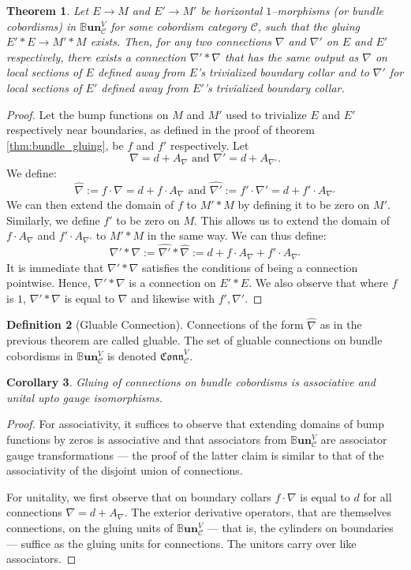 \documentclass{amsart}
\newcommand{\s}{\mathscr}
\newcommand{\wh}{\widehat}
\renewcommand{\to}[1][]{\stackrel{#1}{\longrightarrow}}
\newcommand{\BBun}{\mathbb{B}\textbf{un}}
\newcommand{\Conn}{\mathfrak{Conn}}
\newtheorem{thm}{Theorem}
\numberwithin{thm}{section}
\newtheorem{cor}[thm]{Corollary}
\theoremstyle{definition}
\newtheorem{defn}[thm]{Definition}
\begin{document}
\begin{thm}
Let $E \to M$ and $E' \to M'$ be horizontal $1$--morphisms
(or bundle cobordisms) in $\BBun^V_{\s{C}}$ for some cobordism category $\s{C}$,
such that the gluing $E' * E \to M' * M$ exists. Then, for any two connections
$\nabla$ and $\nabla'$ on $E$ and $E'$ respectively, there exists a connection
$\nabla' * \nabla$ that has the same output as $\nabla$ on local sections of $E$
defined away from $E$'s trivialized boundary collar and to $\nabla'$ for local
sections of $E'$ defined away from $E'$'s trivialized boundary collar.
\end{thm}
\begin{proof}
Let the bump functions on $M$ and $M'$ used to trivialize $E$ and $E'$
respectively near boundaries, as defined in the proof of theorem
\ref{thm:bundle_gluing}, be $f$ and $f'$ respectively. Let
\[
  \nabla = d + A_{\nabla} \text{ and } \nabla' = d + A_{\nabla'}.
\]
We define:
\[
  \wh{\nabla} := f \cdot \nabla = d + f \cdot A_{\nabla}
  \text{ and } \wh{\nabla'} := f' \cdot \nabla' = d + f' \cdot A_{\nabla'}
\]
We can then extend the domain of $f$ to $M' * M$ by defining it to be zero on
$M'$. Similarly, we define $f'$ to be zero on $M$. This allows us to extend the
domain of $f \cdot A_{\nabla}$ and $f' \cdot A_{\nabla'}$ to $M' * M$ in the
same way. We can thus define:
\[
  \nabla' * \nabla := \wh{\nabla'} * \wh{\nabla}
    := d + f \cdot A_{\nabla} + f' \cdot A_{\nabla'}
\]
It is immediate that $\nabla' * \nabla$ satisfies the conditions of being a
connection pointwise. Hence, $\nabla' * \nabla$ is a connection on $E' * E$. We
also observe that where $f$ is $1$, $\nabla' * \nabla$ is equal to $\nabla$ and
likewise with $f', \nabla'$.
\end{proof}

\begin{defn}[Gluable Connection]
Connections of the form $\wh{\nabla}$ as in the previous theorem are called
gluable. The set of gluable connections on bundle cobordisms in
$\BBun^V_{\s{C}}$ is denoted $\Conn^V_{\s{C}}$.
\end{defn}

\begin{cor}
Gluing of connections on bundle cobordisms is associative and unital upto gauge
isomorphisms.
\end{cor}
\begin{proof}
For associativity, it suffices to observe that extending domains of bump
functions by zeros is associative and that associators from $\BBun^V_{\s{C}}$
are associator gauge transformations --- the proof of the latter claim is similar
to that of the associativity of the disjoint union of connections.

For unitality, we first observe that on boundary collars $f \cdot \nabla$ is
equal to $d$ for all connections $\nabla = d + A_{\nabla}$. The exterior
derivative operators, that are themselves connections, on the gluing
units of $\BBun^V_{\s{C}}$ --- that is, the cylinders on boundaries --- suffice
as the gluing units for connections. The unitors carry over like associators.
\end{proof}
\end{document}
